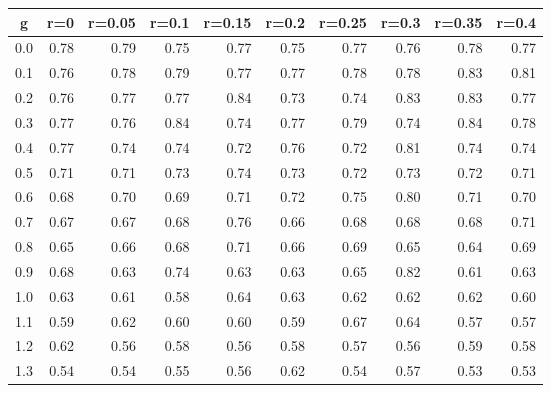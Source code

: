 %
\begin{table}[!tbp]
 \begin{center}
 \begin{tabular}{rrrrrrrrrr}\hline\hline
\multicolumn{1}{c}{g}&\multicolumn{1}{c}{r=0}&\multicolumn{1}{c}{r=0.05}&\multicolumn{1}{c}{r=0.1}&\multicolumn{1}{c}{r=0.15}&\multicolumn{1}{c}{r=0.2}&\multicolumn{1}{c}{r=0.25}&\multicolumn{1}{c}{r=0.3}&\multicolumn{1}{c}{r=0.35}&\multicolumn{1}{c}{r=0.4}\tabularnewline
\hline
0.0&0.78&0.79&0.75&0.77&0.75&0.77&0.76&0.78&0.77\tabularnewline
0.1&0.76&0.78&0.79&0.77&0.77&0.78&0.78&0.83&0.81\tabularnewline
0.2&0.76&0.77&0.77&0.84&0.73&0.74&0.83&0.83&0.77\tabularnewline
0.3&0.77&0.76&0.84&0.74&0.77&0.79&0.74&0.84&0.78\tabularnewline
0.4&0.77&0.74&0.74&0.72&0.76&0.72&0.81&0.74&0.74\tabularnewline
0.5&0.71&0.71&0.73&0.74&0.73&0.72&0.73&0.72&0.71\tabularnewline
0.6&0.68&0.70&0.69&0.71&0.72&0.75&0.80&0.71&0.70\tabularnewline
0.7&0.67&0.67&0.68&0.76&0.66&0.68&0.68&0.68&0.71\tabularnewline
0.8&0.65&0.66&0.68&0.71&0.66&0.69&0.65&0.64&0.69\tabularnewline
0.9&0.68&0.63&0.74&0.63&0.63&0.65&0.82&0.61&0.63\tabularnewline
1.0&0.63&0.61&0.58&0.64&0.63&0.62&0.62&0.62&0.60\tabularnewline
1.1&0.59&0.62&0.60&0.60&0.59&0.67&0.64&0.57&0.57\tabularnewline
1.2&0.62&0.56&0.58&0.56&0.58&0.57&0.56&0.59&0.58\tabularnewline
1.3&0.54&0.54&0.55&0.56&0.62&0.54&0.57&0.53&0.53\tabularnewline
\hline
\end{tabular}

\end{center}

\end{table}

